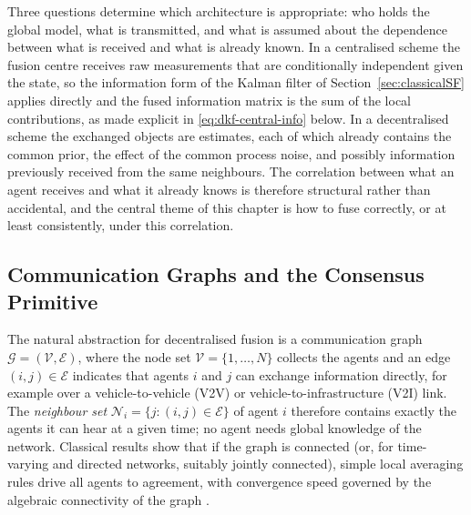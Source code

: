 \documentclass[graybox,envcountchap]{style/SNmono}
\begin{document}
Three questions determine which architecture is appropriate: who holds the global model, what is transmitted, and what is assumed about the dependence between what is received and what is already known. In a centralised scheme the fusion centre receives raw measurements that are conditionally independent given the state, so the information form of the Kalman filter of Section~\ref{sec:classicalSF} applies directly and the fused information matrix is the sum of the local contributions, as made explicit in \eqref{eq:dkf-central-info} below. In a decentralised scheme the exchanged objects are estimates, each of which already contains the common prior, the effect of the common process noise, and possibly information previously received from the same neighbours. The correlation between what an agent receives and what it already knows is therefore structural rather than accidental, and the central theme of this chapter is how to fuse correctly, or at least consistently, under this correlation.

\subsection{Communication Graphs and the Consensus Primitive}
\label{subsec:mas-graph-primitive}


The natural abstraction for decentralised fusion is a communication graph $\mathcal{G}=(\mathcal{V},\mathcal{E})$, where the node set $\mathcal{V}=\{1,\dots,N\}$ collects the agents and an edge $(i,j)\in\mathcal{E}$ indicates that agents $i$ and $j$ can exchange information directly, for example over a vehicle-to-vehicle (V2V) or vehicle-to-infrastructure (V2I) link. The \emph{neighbour set} $\mathcal{N}_i=\{j:(i,j)\in\mathcal{E}\}$ of agent $i$ therefore contains exactly the agents it can hear at a given time; no agent needs global knowledge of the network. Classical results show that if the graph is connected (or, for time-varying and directed networks, suitably jointly connected), simple local averaging rules drive all agents to agreement, with convergence speed governed by the algebraic connectivity of the graph \cite{olfatisaber2007_consensus,ren2005_consensus}.
\end{document}
